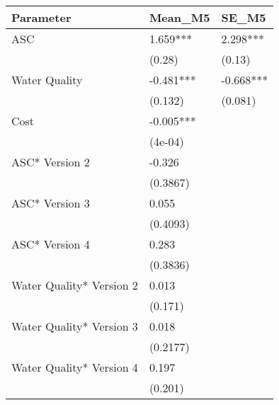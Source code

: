 \begin{table}[ht]
\centering
\begin{tabular}{lll}
  \hline
Parameter & Mean\_M5 & SE\_M5 \\ 
  \hline
ASC & 1.659*** & 2.298*** \\ 
   & (0.28) & (0.13) \\ 
  Water Quality & -0.481*** & -0.668*** \\ 
   & (0.132) & (0.081) \\ 
  Cost & -0.005*** &  \\ 
   & (4e-04) &  \\ 
  ASC* Version 2 & -0.326 &  \\ 
   & (0.3867) &  \\ 
  ASC* Version 3 & 0.055 &  \\ 
   & (0.4093) &  \\ 
  ASC* Version 4 & 0.283 &  \\ 
   & (0.3836) &  \\ 
  Water Quality* Version 2 & 0.013 &  \\ 
   & (0.171) &  \\ 
  Water Quality* Version 3 & 0.018 &  \\ 
   & (0.2177) &  \\ 
  Water Quality* Version 4 & 0.197 &  \\ 
   & (0.201) &  \\ 
   \hline
\end{tabular}
\end{table}
